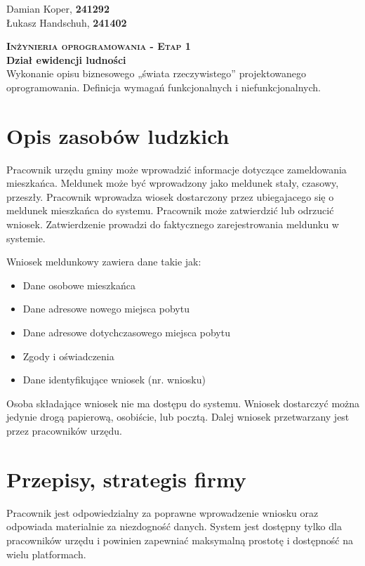 \documentclass[12pt]{article}
\begin{document}
\begin{flushright}
        Damian Koper, \textbf{241292} \\
        Łukasz Handschuh, \textbf{241402}
\end{flushright}
\vspace{1cm}
{
    \centering
    {\Huge\scshape\bfseries Inżynieria oprogramowania - Etap 1 }\\
    \vspace{0.25cm}
    \Large\textbf{Dział ewidencji ludności} \\
    \vspace{0.25cm}
    \large Wykonanie opisu biznesowego „świata rzeczywistego” projektowanego oprogramowania. Definicja wymagań funkcjonalnych i niefunkcjonalnych.\\
}

\section{Opis zasobów ludzkich}

Pracownik urzędu gminy może wprowadzić informacje dotyczące zameldowania mieszkańca. Meldunek może być wprowadzony jako meldunek stały, czasowy, przeszły. Pracownik wprowadza wiosek dostarczony przez ubiegajacego się o meldunek mieszkańca do systemu. Pracownik może zatwierdzić lub odrzucić wniosek. Zatwierdzenie prowadzi do faktycznego zarejestrowania meldunku w systemie.

Wniosek meldunkowy zawiera dane takie jak:
\begin{itemize}
    \item Dane osobowe mieszkańca
    \item Dane adresowe nowego miejsca pobytu
    \item Dane adresowe dotychczasowego miejsca pobytu
    \item Zgody i oświadczenia
    \item Dane identyfikujące wniosek (nr. wniosku)
\end{itemize}

Osoba składające wniosek nie ma dostępu do systemu. Wniosek dostarczyć można jedynie drogą papierową, osobiście, lub pocztą. Dalej wniosek przetwarzany jest przez pracowników urzędu.

\section{Przepisy, strategis firmy}

Pracownik jest odpowiedzialny za poprawne wprowadzenie wniosku oraz odpowiada materialnie za niezdogność danych. System jest dostępny tylko dla pracowników urzędu i powinien zapewniać maksymalną prostotę i dostępność na wielu platformach.
\end{document}
